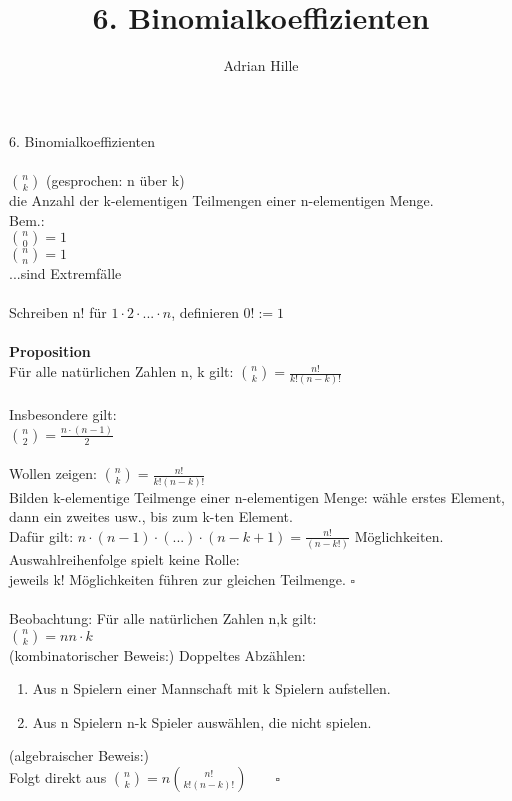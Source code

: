 \documentclass{scrartcl}\usepackage[utf8]{inputenc}
\title{6. Binomialkoeffizienten}
\author{Adrian Hille}
\begin{document}
\Large 6. Binomialkoeffizienten \\
\\
\normalsize
$\binom{n}{k}$ (gesprochen: n \"uber k)\\
die Anzahl der k-elementigen Teilmengen einer n-elementigen Menge.\\
Bem.: \\
$\binom{n}{0} =1$\\
$\binom{n}{n}=1$\\ 
...sind Extremf\"alle\\
\\
Schreiben n! f\"ur $1 \cdot 2 \cdot ... \cdot n$, definieren $0! := 1$\\
\\
\textbf{Proposition}\\
F\"ur alle nat\"urlichen Zahlen n, k gilt: 
$\binom{n}{k} = \frac{n!}{k!(n-k)!}$\\
\\
Insbesondere gilt:\\
$\binom{n}{2} = \frac{n \cdot (n-1) }{2}$\\
\\
Wollen zeigen: $\binom{n}{k} = \frac{n!}{k!(n-k)!}$\\
Bilden k-elementige Teilmenge einer n-elementigen Menge: w\"ahle erstes Element, dann ein zweites usw., bis zum k-ten Element.\\
Daf\"ur gilt: $n \cdot (n-1) \cdot (...) \cdot (n-k+1) = \frac {n!}{(n-k!)}$ M\"oglichkeiten.\\
Auswahlreihenfolge spielt keine Rolle:\\
jeweils k! M\"oglichkeiten f\"uhren zur gleichen Teilmenge. $\square $\\
\\
Beobachtung: F\"ur alle nat\"urlichen Zahlen n,k gilt:\\
$\binom{n}{k}={n}{n \cdot k}$\\
(kombinatorischer Beweis:) Doppeltes Abz\"ahlen:\\
  \begin{enumerate}
    	\item Aus n Spielern einer Mannschaft mit k Spielern aufstellen.
    	\item Aus n Spielern n-k Spieler ausw\"ahlen, die nicht spielen.
    \end{enumerate}
(algebraischer Beweis:)\\
Folgt direkt aus $\binom{n}{k} = n \binom{n!}{k!(n-k)!} \qquad \square $\\
\\
\end{document}
